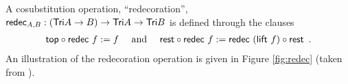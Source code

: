 \documentclass[a4paper,USenglish]{lipics}
\begin{document}
\begin{example}
 

 

\begin{comment}
\begin{figure}[bt]
  \centering

     \def\extraVskip{3pt}
     \def\proofSkipAmount{\vskip.8ex plus.8ex minus.4ex}
    \AxiomC{$t : \Tri~A$} %
     \UnaryInfC{$\head_A~t : A$}
      \DisplayProof
                        \hspace{3ex}
                                       \AxiomC{$t : \Tri~A$}%
                                       \UnaryInfC{$\tail_A~t : \Tri(E\times A)$}
                                       \DisplayProof%
% 
% 
% 
 \hspace{3ex}
                                            \def\extraVskip{3pt}
     \def\proofSkipAmount{\vskip.8ex plus.8ex minus.4ex}
    \AxiomC{$t \sim t'$}%
     \UnaryInfC{$\head~t = \head~t'$}
      \DisplayProof
                        \hspace{3ex}
                                       \AxiomC{$t \sim t'$}%
                                       \UnaryInfC{$ \tail~t \sim \tail~t'$}
                                       \DisplayProof   

  \caption{Destructors and bisimilarity for the coinductive family $\Tri$} \label{fig:tri_destructors}
\end{figure}
\end{comment}
% 
% 
  A cosubstitution operation, \enquote{redecoration},
    $ \mathsf{redec}_{A,B} : (\mathsf{Tri} A \to B) \to \mathsf{Tri} A \to \mathsf{Tri} B$
  is defined  through the clauses
% 
  \begin{align} {\ensuremath{\mathsf{top}}} \circ {\ensuremath{\mathsf{redec}}~f} := f \quad\text{ and } \quad
                  {\ensuremath{\mathsf{rest}}} \circ {\ensuremath{\mathsf{redec}}~f} := {\mathsf{redec}~(\mathsf{lift}~f)} \circ {\ensuremath{\mathsf{rest}}} \enspace . \label{eq:rest_redec}
    \end{align}
An illustration of the redecoration operation is given in Figure \ref{fig:redec} (taken from \cite{DBLP:conf/types/MatthesP11}).    
\begin{figure}[bt]
  \centering
\end{figure}
\end{example}
\end{document}
